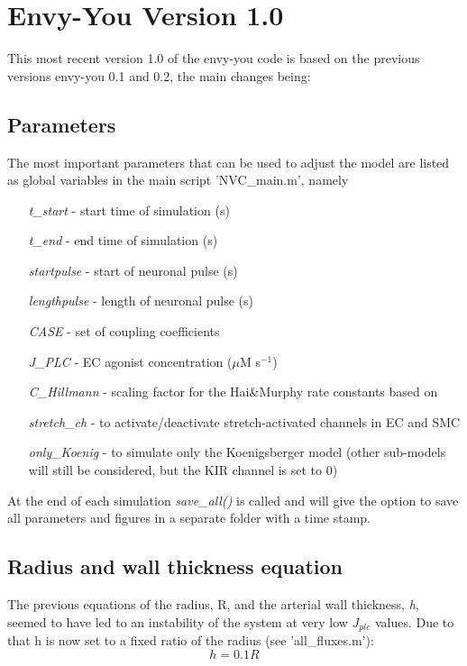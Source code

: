 



\section{Envy-You Version 1.0}
This most recent version 1.0 of the envy-you code is based on the previous versions envy-you 0.1 and 0.2, the main changes being:

\subsection{Parameters}
The most important parameters that can be used to adjust the model are listed as global variables in the main script 'NVC\_main.m', namely
\begin{itemize}
	\item [\textit{t\_start} -] start time of simulation (s)
	\item [\textit{t\_end} -]  end time of simulation (s)
	\item [\textit{startpulse} -]  start of neuronal pulse (s)
	\item [\textit{lengthpulse} -]  length of neuronal pulse (s)
	\item [\textit{CASE} -]  set of coupling coefficients 
	\item [\textit{J\_PLC} -]  EC agonist concentration ($\mu$M s$^{-1}$)
	\item [\textit{C\_Hillmann} -]  scaling factor for the Hai\&Murphy rate constants based on \citet{Hillman2011}
	\item [\textit{stretch\_ch} -] to activate/deactivate stretch-activated channels in EC and SMC
	\item [\textit{only\_Koenig} -]  to simulate only the Koenigsberger model (other sub-models will still be considered, but the KIR channel is set to 0)
\end{itemize}
At the end of each simulation \textit{save\_all()} is called and will give the option to save all parameters and figures in a separate folder with a time stamp. 

\subsection{Radius and wall thickness equation}
The previous equations of the radius, R, and the arterial wall thickness, \textit{h}, seemed to have led to an instability of the system at very low $J_{plc}$ values. Due to that h is now set to a fixed ratio of the radius (see 'all\_fluxes.m'):
\[h = 0.1R\]
